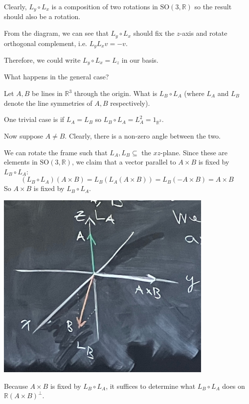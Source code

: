 \documentclass[12pt]{article}
\newcommand{\R}{\mathbb{R}}
\newcommand{\SO}{\text{SO}}
\begin{document}
    Clearly, $L_y \circ L_x$ is a composition of two rotations in $\SO(3, \R)$ so the result should also be a rotation. 

    From the diagram, we can see that $L_y \circ L_x$ should fix the $z$-axis and rotate orthogonal complement, i.e. $L_y L_x v = -v$. 

    Therefore, we could write $L_y \circ L_x = L_z$ in our basis. 

    What happens in the general case? 

    Let $A, B$ be lines in $\R^3$ through the origin. What is $L_B \circ L_A$ (where $L_A$ and $L_B$ denote the line symmetries of $A, B$ respectively). 

    One trivial case is if $L_A = L_B$ so $L_B \circ L_A = L_A^2 = 1_{\R^3}$.

    Now suppose $A \neq B$. Clearly, there is a non-zero angle between the two. 

    We can rotate the frame such that $L_A, L_B \subseteq $ the $xz$-plane. Since these are elements in $\SO(3, \R)$, we claim that a vector parallel to $A \times B$ is fixed by $L_B \circ L_A$: 
    \[(L_B \circ L_A)(A \times B) = L_B(L_A(A \times B)) = L_B(-A \times B) = A \times B\]
    So $A \times B$ is fixed by $L_B \circ L_A$.

    \begin{center}
        \includegraphics[width=0.8\textwidth]{Images/Fixed axis.png}
    \end{center}

    Because $A \times B$ is fixed by $L_B \circ L_A$, it suffices to determine what $L_B \circ L_A$ does on $\R(A \times B)^{\perp}$. 
\end{document}
